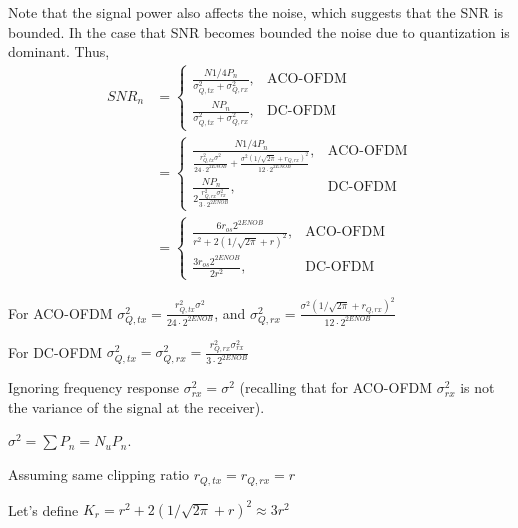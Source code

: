 \documentclass[a4paper]{article}
\begin{document}
Note that the signal power also affects the noise, which suggests that the SNR is bounded. Ih the case that SNR becomes bounded the noise due to quantization is dominant. Thus, 
\begin{align} \nonumber
SNR_n & = \begin{cases}
\frac{N1/4P_n}{\sigma_{Q,tx}^2 + \sigma_{Q,rx}^2}, & \text{ACO-OFDM} \\
\frac{NP_n}{\sigma_{Q,tx}^2 + \sigma_{Q,rx}^2}, & \text{DC-OFDM}
\end{cases} \\
& = \begin{cases}
\frac{N1/4P_n}{\frac{r_{Q,tx}^2\sigma^2}{24\cdot 2^{2ENOB}} + \frac{\sigma^2(1/\sqrt{2\pi} + r_{Q,rx})^2}{12\cdot 2^{2ENOB}}}, & \text{ACO-OFDM} \\
\frac{NP_n}{2\frac{r_{Q,rx}^2\sigma_{rx}^2}{3\cdot 2^{2ENOB}}}, & \text{DC-OFDM}
\end{cases} \\
& = \begin{cases}
\frac{6r_{os}2^{2ENOB}}{r^2 + 2(1/\sqrt{2\pi} + r)^2}, & \text{ACO-OFDM} \\
\frac{3r_{os}2^{2ENOB}}{2r^2}, & \text{DC-OFDM}
\end{cases}
\end{align}

For ACO-OFDM $\sigma^2_{Q,tx} = \frac{r_{Q,tx}^2\sigma^2}{24\cdot 2^{2ENOB}}$, and $\sigma^2_{Q,rx} = \frac{\sigma^2(1/\sqrt{2\pi} + r_{Q,rx})^2}{12\cdot 2^{2ENOB}}$

For DC-OFDM $\sigma^2_{Q,tx} = \sigma^2_{Q,rx} = \frac{r_{Q,rx}^2\sigma_{rx}^2}{3\cdot 2^{2ENOB}}$

Ignoring frequency response $\sigma^2_{rx} = \sigma^2$ (recalling that for ACO-OFDM $\sigma^2_{rx}$  is not the variance of the signal at the receiver).

$\sigma^2 = \sum P_n = N_uP_n$.

Assuming same clipping ratio $r_{Q,tx} = r_{Q,rx} = r$

Let's define $K_r  = r^2 + 2(1/\sqrt{2\pi} + r)^2 \approx 3r^2$
\end{document}
